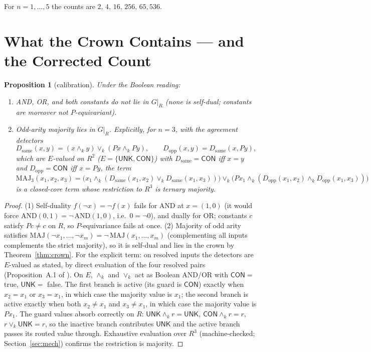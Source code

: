 \documentclass[11pt]{article}
\newtheorem{proposition}[theorem]{Proposition}
\theoremstyle{remark}
\newcommand{\UNK}{\ensuremath{\mathsf{UNK}}}
\newcommand{\CON}{\ensuremath{\mathsf{CON}}}
\newcommand{\meetk}{\ensuremath{\wedge_k}}
\newcommand{\joink}{\ensuremath{\vee_k}}
\newcommand{\GR}{\ensuremath{G|_R}}
\newcommand{\Dsame}{\ensuremath{D_{\mathrm{same}}}}
\newcommand{\Dopp}{\ensuremath{D_{\mathrm{opp}}}}
\begin{document}
For $n=1,\dots,5$ the counts are $2,\,4,\,16,\,256,\,65{,}536$.

\section{What the Crown Contains --- and the Corrected Count}

\begin{proposition}[calibration]\label{prop:calib}
Under the Boolean reading:
\begin{enumerate}
\item AND, OR, and both constants do not lie in \GR{} (none is
  self-dual; constants are moreover not $P$-equivariant).
\item Odd-arity majority lies in \GR. Explicitly, for $n=3$, with the
  agreement detectors
  \[
  \Dsame(x,y)=(x\meetk y)\joink(Px\meetk Py),
  \qquad
  \Dopp(x,y)=\Dsame(x,Py),
  \]
  which are $E$-valued on $R^2$ ($E=\{\UNK,\CON\}$) with
  $\Dsame=\CON$ iff $x=y$ and $\Dopp=\CON$ iff $x=Py$, the term
  \[
  \mathrm{MAJ}_3(x_1,x_2,x_3)=
  \bigl(x_1\meetk(\Dsame(x_1,x_2)\joink\Dsame(x_1,x_3))\bigr)
  \joink
  \bigl(Px_1\meetk(\Dopp(x_1,x_2)\meetk\Dopp(x_1,x_3))\bigr)
  \]
  is a closed-core term whose restriction to $R^3$ is ternary majority.
\end{enumerate}
\end{proposition}

\begin{proof}
(1) Self-duality $f(\neg x)=\neg f(x)$ fails for AND at $x=(1,0)$ (it
would force $\mathrm{AND}(0,1)=\neg\,\mathrm{AND}(1,0)$, i.e.\
$0=\neg 0$), and dually for OR; constants $c$ satisfy $Pc\ne c$ on $R$,
so $P$-equivariance fails at once. (2) Majority of odd arity satisfies
$\mathrm{MAJ}(\neg x_1,\dots,\neg x_m)=\neg\,\mathrm{MAJ}(x_1,\dots,x_m)$
(complementing all inputs complements the strict majority), so it is
self-dual and lies in the crown by Theorem~\ref{thm:crown}. For the
explicit term: on resolved inputs the detectors are $E$-valued as stated,
by direct evaluation of the four resolved pairs (Proposition~A.1 of
\cite{wcy2}). On $E$, $\meetk$ and $\joink$ act as Boolean AND/OR with
$\CON=$ true, $\UNK=$ false. The first branch is active (its guard is
\CON) exactly when $x_2=x_1$ or $x_3=x_1$, in which case the majority
value is $x_1$; the second branch is active exactly when both
$x_2\ne x_1$ and $x_3\ne x_1$, in which case the majority value is
$Px_1$. The guard values absorb correctly on $R$:
$\UNK\meetk r=\UNK$, $\CON\meetk r=r$, $r\joink\UNK=r$, so the inactive
branch contributes \UNK{} and the active branch passes its routed value
through. Exhaustive evaluation over $R^3$ (machine-checked;
Section~\ref{sec:mech}) confirms the restriction is majority.
\end{proof}
\end{document}
